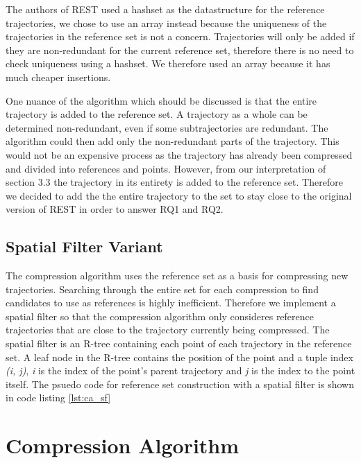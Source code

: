 The authors of REST used a hashset as the datastructure for the reference trajectories, we chose to use an array instead because the uniqueness of the trajectories in the reference set is not a concern. Trajectories will only be added if they are non-redundant for the current reference set, therefore there is no need to check uniqueness using a hashset. We therefore used an array because it has much cheaper insertions.

One nuance of the algorithm which should be discussed is that the entire trajectory is added to the reference set. A trajectory as a whole can be determined non-redundant, even if some subtrajectories are redundant. The algorithm could then add only the non-redundant parts of the trajectory. This would not be an expensive process as the trajectory has already been compressed and divided into references and points. However, from our interpretation of \cite{zhao2018rest} section 3.3 the trajectory in its entirety is added to the reference set. Therefore we decided to add the the entire trajectory to the set to stay close to the original version of REST in order to answer RQ1 and RQ2.

\subsection{Spatial Filter Variant}

The compression algorithm uses the reference set as a basis for compressing new trajectories. Searching through the entire set for each compression to find candidates to use as references is highly inefficient. Therefore we implement a spatial filter so that the compression algorithm only consideres reference trajectories that are close to the trajectory currently being compressed. The spatial filter is an R-tree containing each point of each trajectory in the reference set. A leaf node in the R-tree contains the position of the point and a tuple index \textit{(i, j)}, \textit{i} is the index of the point's parent trajectory and \textit{j} is the index to the point itself. The psuedo code for reference set construction with a spatial filter is shown in code listing \ref{lst:ca_sf}

\section{Compression Algorithm}
